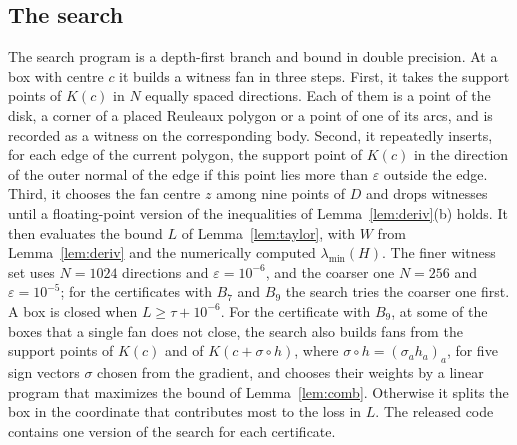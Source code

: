 \documentclass[11pt]{amsart}
\theoremstyle{definition}
\theoremstyle{remark}
\numberwithin{equation}{section}
\newcommand{\lmin}{\lambda_{\min}}
\begin{document}
\subsection{The search}\label{sec:search} The search program is a depth-first branch and bound in double precision. At a box with centre $c$ it builds a witness fan in three steps. First, it takes the support points of $K(c)$ in $N$ equally spaced directions. Each of them is a point of the disk, a corner of a placed Reuleaux polygon or a point of one of its arcs, and is recorded as a witness on the corresponding body. Second, it repeatedly inserts, for each edge of the current polygon, the support point of $K(c)$ in the direction of the outer normal of the edge if this point lies more than $\varepsilon$ outside the edge. Third, it chooses the fan centre $z$ among nine points of $D$ and drops witnesses until a floating-point version of the inequalities of Lemma~\ref{lem:deriv}(b) holds. It then evaluates the bound $L$ of Lemma~\ref{lem:taylor}, with $W$ from Lemma~\ref{lem:deriv} and the numerically computed $\lmin(H)$. The finer witness set uses $N=1024$ directions and $\varepsilon=10^{-6}$, and the coarser one $N=256$ and $\varepsilon=10^{-5}$; for the certificates with $B_7$ and $B_9$ the search tries the coarser one first. A box is closed when $L\ge\tau+10^{-6}$. For the certificate with $B_9$, at some of the boxes that a single fan does not close, the search also builds fans from the support points of $K(c)$ and of $K(c+\sigma\circ h)$, where $\sigma\circ h=(\sigma_ah_a)_a$, for five sign vectors $\sigma$ chosen from the gradient, and chooses their weights by a linear program that maximizes the bound of Lemma~\ref{lem:comb}. Otherwise it splits the box in the coordinate that contributes most to the loss in $L$. The released code contains one version of the search for each certificate.
\end{document}
